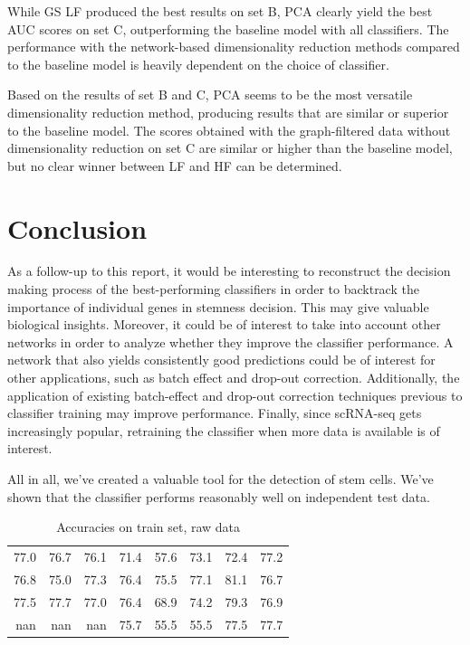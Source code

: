 \documentclass[10pt,conference,compsocconf]{IEEEtran}
\newcommand{\beginsupplement}{%
	\setcounter{table}{0}
	\renewcommand{\thetable}{S\arabic{table}}%
	\setcounter{figure}{0}
	\renewcommand{\thefigure}{S\arabic{figure}}%
}
\begin{document}
While GS LF produced the best results on set B, PCA clearly yield the best AUC scores on set C, outperforming the baseline model with all classifiers. The performance with the network-based dimensionality reduction methods compared to the baseline model is heavily dependent on the choice of classifier. 

Based on the results of set B and C, PCA seems to be the most versatile dimensionality reduction method, producing results that are similar or superior to the baseline model. The scores obtained with the graph-filtered data without dimensionality reduction on set C are similar or higher than the baseline model, but no clear winner between LF and HF can be determined. 

\section*{Conclusion}
As a follow-up to this report, it would be interesting to reconstruct the decision making process of the best-performing classifiers in order to backtrack the importance of individual genes in stemness decision. This may give valuable biological insights. Moreover, it could be of interest to take into account other networks in order to analyze whether they improve the classifier performance. A network that also yields consistently good predictions could be of interest for other applications, such as batch effect and drop-out correction\cite{vanDijk2017}. Additionally, the application of existing batch-effect and drop-out correction techniques previous to classifier training may improve performance. Finally, since scRNA-seq gets increasingly popular, retraining the classifier when more data is available is of interest. 
\par
All in all, we've created a valuable tool for the detection of stem cells. We've shown that the classifier performs reasonably well on independent test data. 






\beginsupplement

\begin{table}[H]
	\centering
	\begin{tabular}{rrrrrrrr}
		\hline
		77.0 &  76.7 &  76.1 & 71.4 & 57.6 & 73.1 & 72.4 & 77.2 \\
		76.8 &  75.0 &  77.3 & 76.4 & 75.5 & 77.1 & 81.1 & 76.7 \\
		77.5 &  77.7 &  77.0 & 76.4 & 68.9 & 74.2 & 79.3 & 76.9 \\
		nan   & nan   & nan   & 75.7 & 55.5 & 55.5 & 77.5 & 77.7 \\
		\hline
	\end{tabular}
	\caption{Accuracies on train set, raw data}
\end{table}
\end{document}

